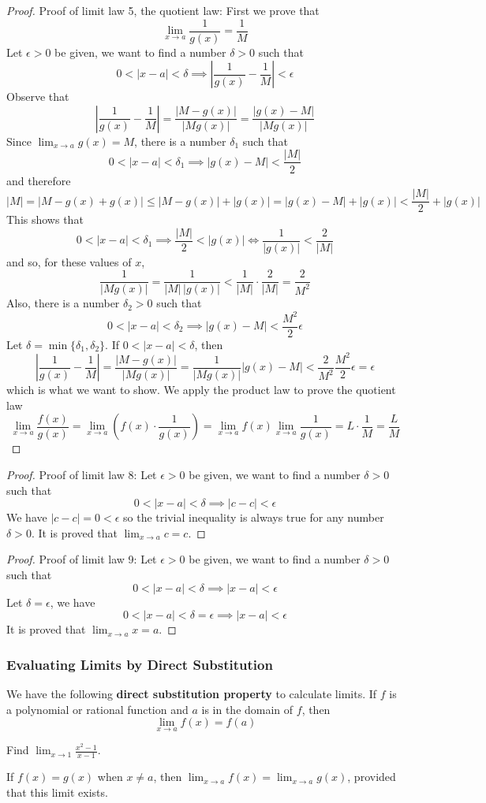 \begin{proof}
    Proof of limit law 5, the quotient law:
    First we prove that \[\lim_{x\to a}\frac{1}{g(x)}=\frac{1}{M}\]
    Let \(\epsilon>0\) be given,
    we want to find a number \(\delta>0\) such that
    \[0<|x-a|<\delta\implies\left|\frac{1}{g(x)}-\frac{1}{M}\right|<\epsilon\]
    Observe that \[\left|\frac{1}{g(x)}-\frac{1}{M}\right|
    =\frac{|M-g(x)|}{|Mg(x)|}=\frac{|g(x)-M|}{|Mg(x)|}\]
    Since \(\displaystyle{\lim_{x\to a}g(x)=M}\),
    there is a number \(\delta_1\) such that
    \[0<|x-a|<\delta_1\implies|g(x)-M|<\frac{|M|}{2}\] and therefore
    \[|M|=|M-g(x)+g(x)|\leq|M-g(x)|+|g(x)|=|g(x)-M|+|g(x)|
    <\frac{|M|}{2}+|g(x)|\]
    This shows that
    \[0<|x-a|<\delta_1\implies\frac{|M|}{2}<|g(x)|\iff\frac{1}{|g(x)|}
    <\frac{2}{|M|}\]
    and so, for these values of \(x\),
    \[\frac{1}{|Mg(x)|}=\frac{1}{|M|\,|g(x)|}<\frac{1}{|M|}\cdot\frac{2}{|M|}
    =\frac{2}{M^2}\]
    Also, there is a number \(\delta_2>0\) such that
    \[0<|x-a|<\delta_2\implies|g(x)-M|<\frac{M^2}{2}\epsilon\]
    Let \(\delta=\min\{\delta_1,\delta_2\}\).
    If \(0<|x-a|<\delta\), then
    \[\left|\frac{1}{g(x)}-\frac{1}{M}\right|=\frac{|M-g(x)|}{|Mg(x)|}
    =\frac{1}{|Mg(x)|}|g(x)-M|<\frac{2}{M^2}\frac{M^2}{2}\epsilon=\epsilon\]
    which is what we want to show.
    We apply the product law to prove the quotient law
    \[\lim_{x\to a}\frac{f(x)}{g(x)}
    =\lim_{x\to a}\left(f(x)\cdot\frac{1}{g(x)}\right)
    =\lim_{x\to a}f(x)\lim_{x\to a}\frac{1}{g(x)}=L\cdot\frac{1}{M}
    =\frac{L}{M}\]
\end{proof}
\begin{proof}
    Proof of limit law 8:
    Let \(\epsilon>0\) be given, we want to find a number \(\delta>0\) such
    that
    \[0<|x-a|<\delta\implies|c-c|<\epsilon\]
    We have \(|c-c|=0<\epsilon\) so the trivial inequality is always true for
    any number \(\delta>0\).
    It is proved that \(\displaystyle{\lim_{x\to a}c=c}\).
\end{proof}
\begin{proof}
    Proof of limit law 9:
    Let \(\epsilon>0\) be given, we want to find a number \(\delta>0\) such
    that \[0<|x-a|<\delta\implies|x-a|<\epsilon\]
    Let \(\delta=\epsilon\), we have
    \[0<|x-a|<\delta=\epsilon\implies|x-a|<\epsilon\]
    It is proved that \(\displaystyle{\lim_{x\to a}x=a}\).
\end{proof}

\subsubsection*{Evaluating Limits by Direct Substitution}
We have the following \textbf{direct substitution property} to calculate
limits.
If \(f\) is a polynomial or rational function and \(a\) is in the domain of
\(f\), then
\[\lim_{x\to a}f(x)=f(a)\]
\begin{problem}
    Find \(\displaystyle{\lim_{x\to 1}\frac{x^2-1}{x-1}}\).
\end{problem}
If \(f(x)=g(x)\) when \(x\neq a\),
then \(\displaystyle{\lim_{x\to a}f(x)=\lim_{x\to a}g(x)}\),
provided that this limit exists.

